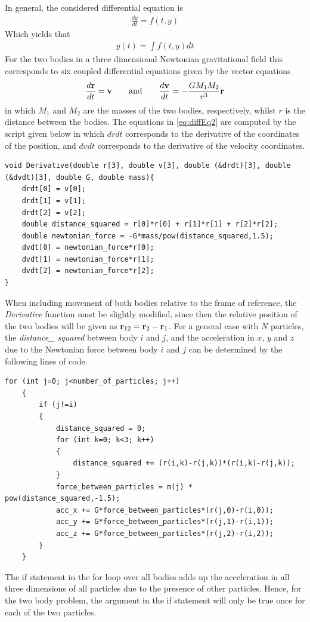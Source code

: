 In general, the considered differential equation is
\begin{align}
	\frac{dy}{dt} = f(t,y)
	\label{eq:diffEq1}
\end{align}
Which yields that
\begin{align}
	y(t) = \int f(t,y) dt
\end{align}
For the two bodies in a three dimensional Newtonian gravitational field this corresponds to six coupled differential equations given by the vector equations
\begin{align}
	\frac{d\mbox{\textbf{r}}}{dt} = \mbox{\textbf{v}}
	\qquad \text{and} \qquad
	\frac{d\mbox{\textbf{v}}}{dt} = - \frac{G M_1 M_2}{r^3} \mbox{\textbf{r}}
	\label{eq:diffEq2}
\end{align}
in which $M_1$ and $M_2$  are the masses of the two bodies, respectively, whilst $r$ is the distance between the bodies.
The equations in \eqref{eq:diffEq2} are computed by the script given below in which $drdt$ corresponds to the derivative of the coordinates of the position, and $dvdt$ corresponds to the derivative of the velocity coordinates. 
\begin{lstlisting}
void Derivative(double r[3], double v[3], double (&drdt)[3], double (&dvdt)[3], double G, double mass){
    drdt[0] = v[0];
    drdt[1] = v[1];
    drdt[2] = v[2];
    double distance_squared = r[0]*r[0] + r[1]*r[1] + r[2]*r[2];
    double newtonian_force = -G*mass/pow(distance_squared,1.5);
    dvdt[0] = newtonian_force*r[0];
    dvdt[1] = newtonian_force*r[1];
    dvdt[2] = newtonian_force*r[2];
}
\end{lstlisting}
When including movement of both bodies relative to the frame of reference, the \textit{Derivative} function must be slightly modified, since then the relative position of the two bodies will be given as $\mbox{\textbf{r}}_{12} = \mbox{\textbf{r}}_2 - \mbox{\textbf{r}}_1$.
For a general case with $N$ particles, the \textit{distance\_ squared} between body $i$ and $j$, and the acceleration in $x$, $y$ and $z$ due to the Newtonian force between body $i$ and $j$ can be determined by the following lines of code.
\begin{lstlisting}
for (int j=0; j<number_of_particles; j++)
    {
        if (j!=i)
        {
            distance_squared = 0;
            for (int k=0; k<3; k++)
            {
                distance_squared += (r(i,k)-r(j,k))*(r(i,k)-r(j,k));
            }
            force_between_particles = m(j) * pow(distance_squared,-1.5);
            acc_x += G*force_between_particles*(r(j,0)-r(i,0));
            acc_y += G*force_between_particles*(r(j,1)-r(i,1));
            acc_z += G*force_between_particles*(r(j,2)-r(i,2));
        }
    }
\end{lstlisting}
The if statement in the for loop over all bodies adds up the acceleration in all three dimensions of all particles due to the presence of other particles.
Hence, for the two body problem, the argument in the if statement will only be true once for each of the two particles.